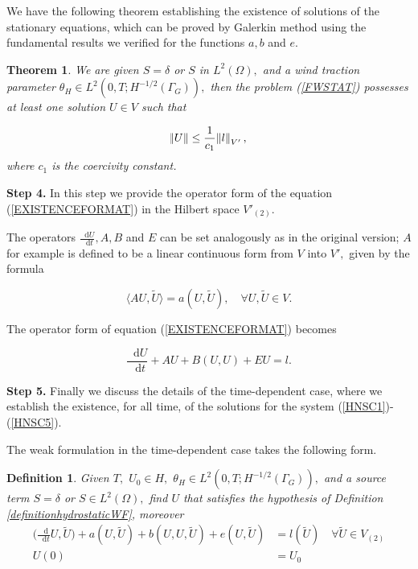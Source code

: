 \documentclass[11pt]{article}
\newtheorem{theorem}{Theorem}
\newtheorem{definition}{Definition}
\newcommand*\diff{\mathop{}\!\mathrm{d}}
\begin{document}
We have the following theorem establishing the existence of solutions of the stationary equations, which can be proved by Galerkin method using the fundamental results we verified for the functions $a,b$ and $e$.

\begin{theorem}
We are given $S = \delta$ or $S$ in $L^2(\Omega),$ and a wind traction parameter $\theta_H \in L^2(0,T;H^{-1/2}(\Gamma_G)),$ then the problem (\ref{FWSTAT}) possesses at least one solution $U \in V$ such that

\[ \norm{U} \leq \frac{1}{c_1} \norm{l}_{V'},\] where $c_1$ is the coercivity constant.

\end{theorem}

\textbf{Step 4.} In this step we provide the operator form of the equation (\ref{EXISTENCEFORMAT}) in the Hilbert space $V'_{(2)}$.

The operators $ \frac{\diff U}{\diff t}, A, B$ and $E$ can be set analogously as in the original version; $A$ for example is defined to be a linear continuous form from $V$ into $V',$ given by the formula

\[ \langle AU, \tilde{U} \rangle = a(U, \tilde{U}), \quad \forall U, \tilde{U} \in V.\]

The operator form of equation (\ref{EXISTENCEFORMAT}) becomes

\[ \frac{\diff U}{\diff t} + AU + B(U,U) + EU = l.\]

\textbf{Step 5.} Finally we discuss the details of the time-dependent case, where we establish the existence, for all time, of the solutions for the system (\ref{HNSC1})-(\ref{HNSC5}).

The weak formulation in the time-dependent case takes the following form.

\begin{definition}

Given $T,$ $U_0 \in H,$ $\theta_H \in L^2(0,T;H^{-1/2}(\Gamma_G)),$ and a source term $S = \delta$ or $S \in L^2(\Omega),$ find $U$ that satisfies the hypothesis of Definition \ref{definitionhydrostaticWF}, moreover
%
\begin{equation} \label{timedependentWFE}
\begin{split}
\bigg ( \frac{\diff}{\diff t} U, \tilde{U} \bigg ) + a(U, \tilde{U}) + b(U,U, \tilde{U})+ e(U, \tilde{U}) & = l(\tilde{U}) \quad \forall \tilde{U} \in V_{(2)} \\
U(0) &= U_0
\end{split}
\end{equation}
%
\end{definition}
\end{document}

